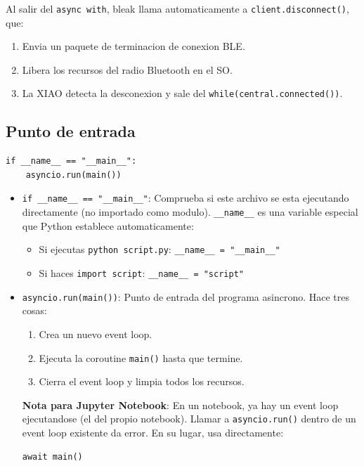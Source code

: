 \documentclass[11pt,a4paper]{article}
\begin{document}
Al salir del \texttt{async with}, bleak llama automaticamente a
\texttt{client.disconnect()}, que:
\begin{enumerate}
    \item Envia un paquete de terminacion de conexion BLE.
    \item Libera los recursos del radio Bluetooth en el SO.
    \item La XIAO detecta la desconexion y sale del
          \texttt{while(central.connected())}.
\end{enumerate}

\subsection{Punto de entrada}

\begin{lstlisting}[style=python]
if __name__ == "__main__":
    asyncio.run(main())
\end{lstlisting}

\begin{itemize}
    \item \texttt{if \_\_name\_\_ == "\_\_main\_\_"}: Comprueba si
          este archivo se esta ejecutando directamente (no
          importado como modulo). \texttt{\_\_name\_\_} es una
          variable especial que Python establece automaticamente:
    \begin{itemize}
        \item Si ejecutas \texttt{python script.py}:
              \texttt{\_\_name\_\_ = "\_\_main\_\_"}
        \item Si haces \texttt{import script}:
              \texttt{\_\_name\_\_ = "script"}
    \end{itemize}

    \item \texttt{asyncio.run(main())}: Punto de entrada del
          programa asincrono. Hace tres cosas:
    \begin{enumerate}
        \item Crea un nuevo event loop.
        \item Ejecuta la coroutine \texttt{main()} hasta que
              termine.
        \item Cierra el event loop y limpia todos los recursos.
    \end{enumerate}

    \textbf{Nota para Jupyter Notebook}: En un notebook, ya hay un
    event loop ejecutandose (el del propio notebook). Llamar a
    \texttt{asyncio.run()} dentro de un event loop existente da
    error. En su lugar, usa directamente:
\begin{lstlisting}[style=python]
await main()
\end{lstlisting}
\end{itemize}
\end{document}
